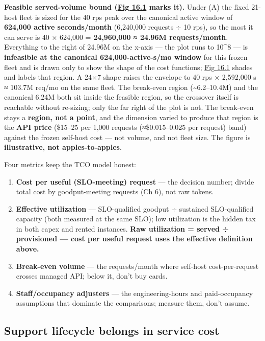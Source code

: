 \textbf{Feasible served-volume bound (\hyperref[fig:16.1]{Fig 16.1} marks it).} Under (A) the
fixed 21-host fleet is sized for the 40 rps peak over the canonical
active window of \textbf{624,000 active seconds/month} (6,240,000
requests ÷ 10 rps), so the most it can serve is 40 × 624,000 =
\textbf{24,960,000 ≈ 24.96M requests/month}. Everything to the right of
24.96M on the x-axis --- the plot runs to 10\^{}8 --- is
\textbf{infeasible at the canonical 624,000-active-s/mo window} for this
frozen fleet and is drawn only to show the shape of the cost functions;
\hyperref[fig:16.1]{Fig 16.1} shades and labels that region. A 24×7 shape raises the envelope
to 40 rps × 2,592,000 s ≈ 103.7M req/mo on the same fleet. The
break-even region (\textasciitilde6.2--10.4M) and the canonical 6.24M
both sit inside the feasible region, so the crossover itself is
reachable without re-sizing; only the far right of the plot is not. The
break-even stays a \textbf{region, not a point}, and the dimension
varied to produce that region is the \textbf{API price} (\$15--25 per
1,000 requests (≈\$0.015--0.025 per request) band) against the frozen
self-host cost --- not volume, and not fleet size. The figure is
\textbf{illustrative, not apples-to-apples}.

\label{measurement}


Four metrics keep the TCO model honest:

\begin{enumerate}
\def\labelenumi{\arabic{enumi}.}
\tightlist
\item
  \textbf{Cost per useful (SLO-meeting) request} --- the decision
  number; divide total cost by goodput-meeting requests (Ch 6), not raw
  tokens.
\item
  \textbf{Effective utilization} --- SLO-qualified goodput ÷ sustained
  SLO-qualified capacity (both measured at the same SLO); low
  utilization is the hidden tax in both capex and rented instances.
  \textbf{Raw utilization = served ÷ provisioned --- cost per useful
  request uses the effective definition above.}
\item
  \textbf{Break-even volume} --- the requests/month where self-host
  cost-per-request crosses managed API; below it, don't buy cards.
\item
  \textbf{Staff/occupancy adjusters} --- the engineering-hours and
  paid-occupancy assumptions that dominate the comparisons; measure
  them, don't assume.
\end{enumerate}

\subsection{Support lifecycle belongs in service
cost}\label{support-lifecycle-belongs-in-service-cost}

